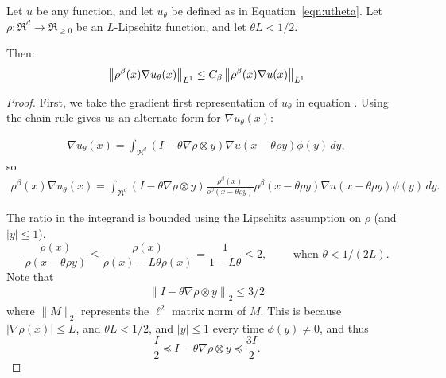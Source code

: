   \begin{lemma} \label{lem:rep2}
  Let $u$ be any function, and let $u_{\theta}$ be defined as in
  Equation~\ref{eqn:utheta}. Let $\rho:\Re^d \to \Re_{\geq 0}$ be an
  $L$-Lipschitz function, and
  let $\theta L < 1/2$.

  Then:
  \begin{align}
      \left\lVert \rho^\beta(x) \nabla u_{\theta}(x) \right\rVert_{L^1} \leq C_{\beta}
      \left\lVert \rho^\beta(x) \nabla u(x) \right\rVert_{L^1}
  \end{align}
  \end{lemma}
  \begin{proof}
  First, we take the gradient 
  first representation of $u_\theta$
  in equation . Using the chain rule gives us an
  alternate form for $\nabla u_\theta(x)$:

  \begin{align}
  \nabla u_\theta(x) 
  = \int_{\Re^d} 
  (I - \theta \nabla \rho \otimes y) \nabla u(x-\theta \rho y) \phi(y) \, dy,
  \end{align}
  so
  \begin{align}\label{eqn:rhoNablaUtheta}
  \rho^\beta(x) \nabla u_\theta(x) 
  = \int_{\Re^d} 
  (I - \theta \nabla \rho \otimes y)
  \frac{\rho^\beta(x)}{\rho^\beta(x-\theta \rho y)}
  \rho^\beta(x-\theta \rho y) \nabla u(x-\theta \rho y) \phi(y) \, dy.
  \end{align}

  The ratio in the integrand is bounded using the Lipschitz assumption
  on $\rho$ (and $|y| \leq 1$),
  \begin{equation} \label{eqn:rhoRatio}
    \frac{\rho(x)}{\rho(x-\theta \rho y)}
    \leq \frac{\rho(x)}{\rho(x) - L \theta \rho(x)}
    = \frac{1}{1 - L \theta} \leq 2,
    \qquad \text{ when } \theta < 1 / (2L).
  \end{equation}
  Note that 
  \begin{align} \label{eqn:matrix-norm} 
  \left\| I - \theta \nabla \rho \otimes y \right\|_2 \leq 3/2
  \end{align}
  where $\|M\|_2$ represents the $\ell^2$ matrix norm of $M$. This is
  because $|\nabla \rho(x) | \leq L$, and
  $\theta L < 1/2$, and $|y| \leq
  1$ every time $\phi(y) \not= 0$, and thus 
  \[ 
   \frac{I}{2} \preceq  I - \theta \nabla \rho \otimes y
   \preceq \frac{3I}{2}.
    \]
  

\end{proof}
